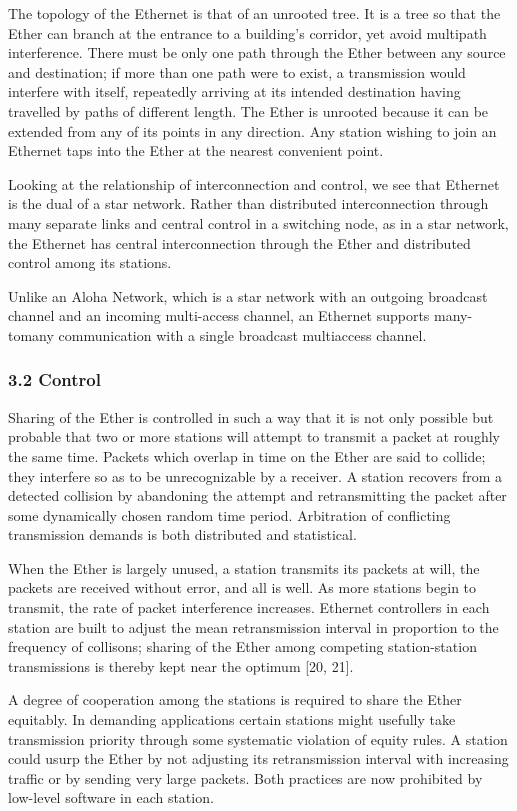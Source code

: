 The topology of the Ethernet is that of an unrooted tree. It is a tree so that the Ether can branch at the entrance to a building's corridor, yet avoid multipath interference. There must be only one path through the Ether between any source and destination; if more than one path were to exist, a transmission would interfere with itself, repeatedly arriving at its intended destination having travelled by paths of different length. The Ether is unrooted because it can be extended from any of its points in any direction. Any station wishing to join an Ethernet taps into the Ether at the nearest convenient point.

Looking at the relationship of interconnection and control, we see that Ethernet is the dual of a star network. Rather than distributed interconnection through many separate links and central control in a switching node, as in a star network, the Ethernet has central interconnection through the Ether and distributed control among its stations.

Unlike an Aloha Network, which is a star network with an outgoing broadcast channel and an incoming multi-access channel, an Ethernet supports many-tomany communication with a single broadcast multiaccess channel.

\subsubsection{3.2 Control}
Sharing of the Ether is controlled in such a way that it is not only possible but probable that two or more stations will attempt to transmit a packet at roughly the same time. Packets which overlap in time on the Ether are said to collide; they interfere so as to be unrecognizable by a receiver. A station recovers from a detected collision by abandoning the attempt and retransmitting the packet after some dynamically chosen random time period. Arbitration of conflicting transmission demands is both distributed and statistical.

When the Ether is largely unused, a station transmits its packets at will, the packets are received without error, and all is well. As more stations begin to transmit, the rate of packet interference increases. Ethernet controllers in each station are built to adjust the mean retransmission interval in proportion to the frequency of collisons; sharing of the Ether among competing station-station transmissions is thereby kept near the optimum [20, 21].

A degree of cooperation among the stations is required to share the Ether equitably. In demanding applications certain stations might usefully take transmission priority through some systematic violation of equity rules. A station could usurp the Ether by not adjusting its retransmission interval with increasing traffic or by sending very large packets. Both practices are now prohibited by low-level software in each station.

